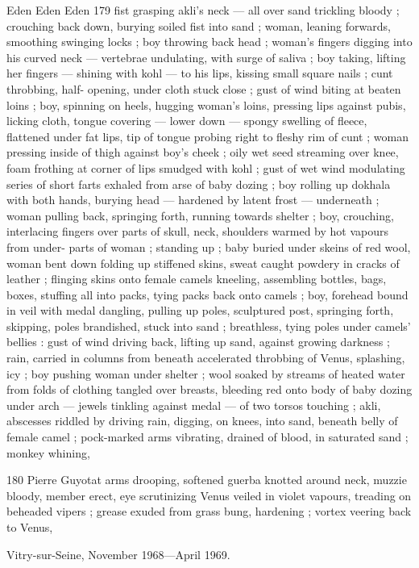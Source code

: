 Eden Eden Eden 179
fist grasping akli's neck — all over sand trickling bloody ; crouching
back down, burying soiled fist into sand ; woman, leaning forwards,
smoothing swinging locks ; boy throwing back head ; woman's
fingers digging into his curved neck — vertebrae undulating, with
surge of saliva ; boy taking, lifting her fingers — shining with kohl
— to his lips, kissing small square nails ; cunt throbbing, half-
opening, under cloth stuck close ; gust of wind biting at beaten loins
; boy, spinning on heels, hugging woman's loins, pressing lips
against pubis, licking cloth, tongue covering — lower down —
spongy swelling of fleece, flattened under fat lips, tip of tongue
probing right to fleshy rim of cunt ; woman pressing inside of thigh
against boy's cheek ; oily wet seed streaming over knee, foam
frothing at corner of lips smudged with kohl ; gust of wet wind
modulating series of short farts exhaled from arse of baby dozing ;
boy rolling up dokhala with both hands, burying head — hardened
by latent frost — underneath ; woman pulling back, springing forth,
running towards shelter ; boy, crouching, interlacing fingers over
parts of skull, neck, shoulders warmed by hot vapours from under-
parts of woman ; standing up ; baby buried under skeins of red wool,
woman bent down folding up stiffened skins, sweat caught powdery
in cracks of leather ; flinging skins onto female camels kneeling,
assembling bottles, bags, boxes, stuffing all into packs, tying packs
back onto camels ; boy, forehead bound in veil with medal dangling,
pulling up poles, sculptured post, springing forth, skipping, poles
brandished, stuck into sand ; breathless, tying poles under camels’
bellies : gust of wind driving back, lifting up sand, against growing
darkness ; rain, carried in columns from beneath accelerated
throbbing of Venus, splashing, icy ; boy pushing woman under
shelter ; wool soaked by streams of heated water from folds of
clothing tangled over breasts, bleeding red onto body of baby
dozing under arch — jewels tinkling against medal — of two torsos
touching ; akli, abscesses riddled by driving rain, digging, on knees,
into sand, beneath belly of female camel ; pock-marked arms
vibrating, drained of blood, in saturated sand ; monkey whining,

180 Pierre Guyotat
arms drooping, softened guerba knotted around neck, muzzie
bloody, member erect, eye scrutinizing Venus veiled in violet
vapours, treading on beheaded vipers ; grease exuded from grass
bung, hardening ; vortex veering back to Venus,

Vitry-sur-Seine, November 1968—April 1969.
